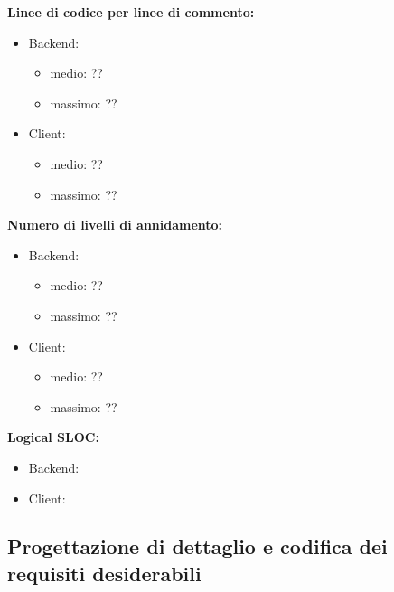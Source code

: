 \begin{description}
				\item \textbf{Linee di codice per linee di commento:}
					\begin{itemize}
						\item Backend:
							\begin{itemize}
								\item medio: ??
								\item massimo: ??
							\end{itemize}
						\item Client:
							\begin{itemize}
								\item medio: ??
								\item massimo: ??
							\end{itemize}
					\end{itemize}
							
				\item \textbf{Numero di livelli di annidamento:}
					\begin{itemize}
						\item Backend:
							\begin{itemize}
								\item medio: ??
								\item massimo: ??
							\end{itemize}
						\item Client:
							\begin{itemize}
								\item medio: ??
								\item massimo: ??
							\end{itemize}
					\end{itemize}
					
				\item \textbf{Logical SLOC:}
					\begin{itemize}
						\item Backend:
						\item Client:
					\end{itemize}
					
	\subsection{Progettazione di dettaglio e codifica dei requisiti desiderabili}

\end{description}
